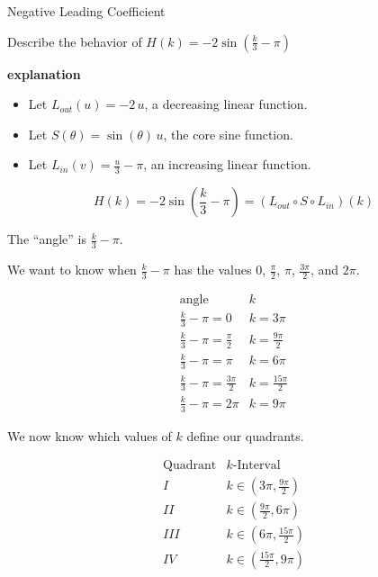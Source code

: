 \documentclass{ximera}
\begin{document}
\begin{example} Negative Leading Coefficient

Describe the behavior of   $H(k) = -2 \sin\left( \frac{k}{3} - \pi \right)$



\textbf{\textcolor{red!75!green}{explanation}} 



\begin{itemize}
\item Let $L_{out}(u) = -2 \, u$, a decreasing linear function.
\item Let $S(\theta) = \sin(\theta)  \, u$, the core sine function.
\item Let $L_{in}(v) = \frac{u}{3} - \pi$, an increasing linear function.
\end{itemize}



\[
H(k) = -2 \sin\left( \frac{k}{3} - \pi \right) = (L_{out} \circ S \circ L_{in})(k)
\]



The ``angle'' is $\frac{k}{3} - \pi$.

We want to know when $\frac{k}{3} - \pi$ has the values $0$, $\frac{\pi}{2}$, $\pi$, $\frac{3\pi}{2}$, and $2\pi$.






\[
\begin{array}{l|l}
\text{angle}                  & k  \\ \hline
\frac{k}{3} - \pi = 0        & k = 3 \pi  \\
\frac{k}{3} - \pi = \frac{\pi}{2}      &  k = \frac{9\pi}{2} \\
\frac{k}{3} - \pi = \pi      & k = 6 \pi  \\
\frac{k}{3} - \pi = \frac{3\pi}{2}     & k = \frac{15\pi}{2}   \\
\frac{k}{3} - \pi = 2\pi     & k = 9 \pi
\end{array}
\]


We now know which values of $k$ define our quadrants.





\[
\begin{array}{l|l}
\text{Quadrant}                  & k\text{-Interval}  \\  \hline
I        & k \in  \left( 3\pi, \frac{9\pi}{2} \right)  \\
II       & k \in  \left( \frac{9\pi}{2}, 6 \pi \right) \\
III      & k \in  \left( 6 \pi, \frac{15\pi}{2} \right)  \\
IV       & k \in  \left( \frac{15\pi}{2}, 9 \pi \right)   \\
\end{array}
\]




\end{example}
\end{document}
